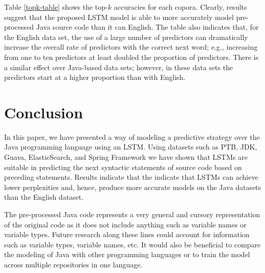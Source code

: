 \documentclass[runningheads,a4paper]{llncs}
\begin{document}
Table \ref{topk-table} shows the top-$k$ accuracies for each copora.
Clearly, results suggest that the proposed LSTM model is able to more
accurately model pre-processed Java source code than it can English. The table
also indicates that, for the English data set, the use of a large number of
predictors can dramatically increase the overall rate of predictors with the
correct next word; e.g., increasing from one to ten predictors at least doubled
the proportion of predictors. There is a similar effect over Java-based data
sets; however, in these data sets the predictors start at a higher proportion
than with English.

\section{Conclusion}

In this paper, we have presented a way of modeling a predictive strategy
over the Java programming language using an LSTM. Using datasets such as PTB,
JDK, Guava, ElasticSearch, and Spring Framework we have shown that
LSTMs are suitable in predicting the next syntactic statements of source
code based on preceding statements. Results indicate that the indicate
that LSTMs can achieve lower perplexities and, hence, produce more accurate models
on the Java datasets than the English dataset.

The pre-processed Java code represents a very general and cursory
representation of the original code as it does not include anything such
as variable names or variable types. Future research along these lines
could account for information such as variable types, variable names, etc.
It would also be beneficial to compare the modeling of Java with other
programming languages or to train the model across multiple repositories
in one language.



\end{document}
